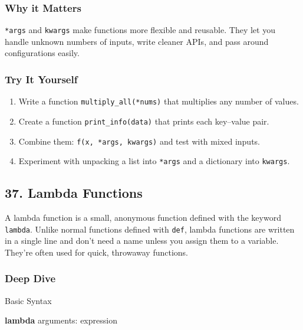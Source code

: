 \documentclass[
  letterpaper,
  DIV=11,
  numbers=noendperiod]{scrreprt}
\newenvironment{Shaded}{\begin{snugshade}}{\end{snugshade}}
\newcommand{\KeywordTok}[1]{\textcolor[rgb]{0.00,0.23,0.31}{\textbf{#1}}}
\newcommand{\NormalTok}[1]{\textcolor[rgb]{0.00,0.23,0.31}{#1}}
\providecommand{\tightlist}{%
  \setlength{\itemsep}{0pt}\setlength{\parskip}{0pt}}
\begin{document}
\subsubsection{Why it Matters}\label{why-it-matters-35}

\texttt{*args} and \texttt{kwargs} make functions more flexible and
reusable. They let you handle unknown numbers of inputs, write cleaner
APIs, and pass around configurations easily.

\subsubsection{Try It Yourself}\label{try-it-yourself-35}

\begin{enumerate}
\def\labelenumi{\arabic{enumi}.}
\tightlist
\item
  Write a function \texttt{multiply\_all(*nums)} that multiplies any
  number of values.
\item
  Create a function \texttt{print\_info(data)} that prints each
  key--value pair.
\item
  Combine them: \texttt{f(x,\ *args,\ kwargs)} and test with mixed
  inputs.
\item
  Experiment with unpacking a list into \texttt{*args} and a dictionary
  into \texttt{kwargs}.
\end{enumerate}

\subsection{37. Lambda Functions}\label{lambda-functions}

A lambda function is a small, anonymous function defined with the
keyword \texttt{lambda}. Unlike normal functions defined with
\texttt{def}, lambda functions are written in a single line and don't
need a name unless you assign them to a variable. They're often used for
quick, throwaway functions.

\subsubsection{Deep Dive}\label{deep-dive-36}

Basic Syntax

\begin{Shaded}
\begin{Highlighting}[]
\KeywordTok{lambda}\NormalTok{ arguments: expression}
\end{Highlighting}
\end{Shaded}
\end{document}
